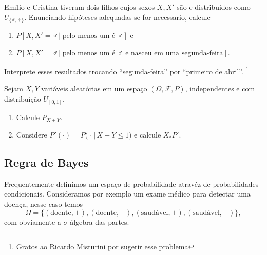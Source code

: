 \begin{exercise}
  Emílio e Cristina tiveram dois filhos cujos sexos $X, X'$ são \iid e distribuidos como $U_{\{\male, \female\}}$.
Enunciando hipóteses adequadas se for necessario,  calcule
  \begin{enumerate}[\quad a)]
  \item $P[X, X' = \male | \text{ pelo menos um é $\male$}]$ e
  \item $P[X, X' = \male | \text{ pelo menos um é $\male$ e nasceu em uma segunda-feira}]$.
  \end{enumerate}
  Interprete esses resultados trocando ``segunda-feira'' por ``primeiro de abril''.
  \footnote{Gratos ao Ricardo Misturini por sugerir esse problema}
\end{exercise}
% 

\begin{exercise}
  Sejam $X, Y$ vari\'aveis aleat\'orias em um espaço $(\Omega, \mathcal{F}, P)$, independentes e com distribuição $U_{[0,1]}$.
  \begin{enumerate}[\quad a)]
  \item Calcule $ P_{X+Y}$.
  \item Considere $P'(\cdot) = P\big(\cdot \, | \, X + Y \leq 1 \big)$ e calcule $X_* P'$.
  \end{enumerate}
\end{exercise}


\subsection{Regra de Bayes}

Frequentemente definimos um espaço de probabilidade atravéz de probabilidades condicionais.
Consideramos por exemplo um exame médico para detectar uma doença, nesse caso temos
\begin{equation}
  \Omega = \{(\text{doente}, +), (\text{doente}, -), (\text{saudável}, +), (\text{saudável}, -)\},
\end{equation}
com obviamente a $\sigma$-álgebra das partes.

